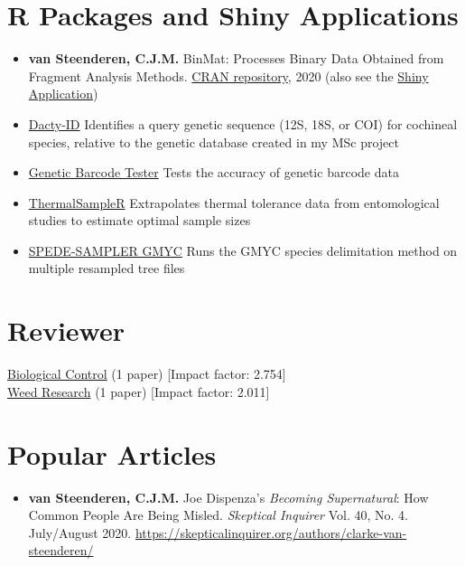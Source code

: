\documentclass{article}
\begin{document}
\section{R Packages and Shiny Applications}
    \begin{itemize}
    \item \textbf{van Steenderen, C.J.M.} BinMat:  Processes Binary Data Obtained from Fragment Analysis Methods. \href{https://cran.r-project.org/web/packages/BinMat/}{CRAN repository}, 2020 (also see the \href{https://clarkevansteenderen.shinyapps.io/BINMAT/?_ga=2.18474297.1423947265.1599643639-2015717805.1599643639}{Shiny Application})
    \item \href{https://clarkevansteenderen.shinyapps.io/Dactylopius_ID_version_1/?_ga=2.47818023.1423947265.1599643639-2015717805.1599643639}{Dacty-ID} Identifies a query genetic sequence (12S, 18S, or COI) for cochineal species, relative to the genetic database created in my MSc project
    \item \href{https://clarkevansteenderen.shinyapps.io/BarcodeTester/?_ga=2.47818023.1423947265.1599643639-2015717805.1599643639}{Genetic Barcode Tester} Tests the accuracy of genetic barcode data
    \item \href{https://clarkevansteenderen.shinyapps.io/ThermalSampleR_Shiny/}{ThermalSampleR} Extrapolates thermal tolerance data from entomological studies to estimate optimal sample sizes  
    \item \href{https://github.com/CJMvS/spede-sampler}{SPEDE-SAMPLER GMYC} Runs the GMYC species delimitation method on multiple resampled tree files
    \end{itemize}
    
\section{Reviewer}
\href{https://www.journals.elsevier.com/biological-control}{Biological Control} (1 paper) [Impact factor: 2.754] \\
\href{https://onlinelibrary.wiley.com/journal/13653180}{Weed Research} (1 paper) [Impact factor: 2.011]

\section{Popular Articles}
\begin{itemize}
    \item \textbf{van Steenderen, C.J.M.} Joe Dispenza’s \textit{Becoming Supernatural}:
How Common People Are Being Misled. \textit{Skeptical Inquirer} Vol. 40, No. 4. July/August 2020. \url{https://skepticalinquirer.org/authors/clarke-van-steenderen/}
\end{itemize}
\end{document}
